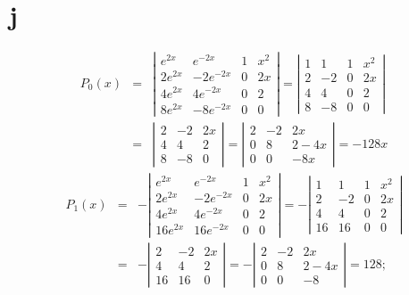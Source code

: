 \documentclass[dvips]{book}
\numberwithin{example}{section}
\numberwithin{equation}{section}
\numberwithin{theorem}{section}
\numberwithin{table}{section}
\numberwithin{figure}{section}
\begin{document}
\part{j}
\begin{eqnarray*}
P_0(x)&=&
\left|\begin{array}{crcc}
e^{2x}&e^{-2x}&1&x^2\\
2e^{2x}&-2e^{-2x}&0&2x\\
4e^{2x}&4e^{-2x}&0&2\\
8e^{2x}&-8e^{-2x}&0&0
\end{array}\right|=
\left|\begin{array}{crcc}
1&1&1&x^2\\
2&-2&0&2x\\
4&4&0&2\\
8&-8&0&0
\end{array}\right|\\
&=&\left|\begin{array}{crcc}
2&-2&2x\\
4&4&2\\
8&-8&0
\end{array}\right|
=\left|\begin{array}{crcc}
2&-2&2x\\
0&8&2-4x\\
0&0&-8x
\end{array}\right|=-128x
\end{eqnarray*}
\begin{eqnarray*}
P_1(x)&=&
-\left|\begin{array}{crcc}
e^{2x}&e^{-2x}&1&x^2\\
2e^{2x}&-2e^{-2x}&0&2x\\
4e^{2x}&4e^{-2x}&0&2\\
16e^{2x}&16e^{-2x}&0&0
\end{array}\right|=
-\left|\begin{array}{crcc}
1&1&1&x^2\\
2&-2&0&2x\\
4&4&0&2\\
16&16&0&0
\end{array}\right|\\
&=&-\left|\begin{array}{crcc}
2&-2&2x\\
4&4&2\\
16&16&0
\end{array}\right|
=-\left|\begin{array}{crcc}
2&-2&2x\\
0&8&2-4x\\
0&0&-8
\end{array}\right|=128;
\end{eqnarray*}
\end{document}
